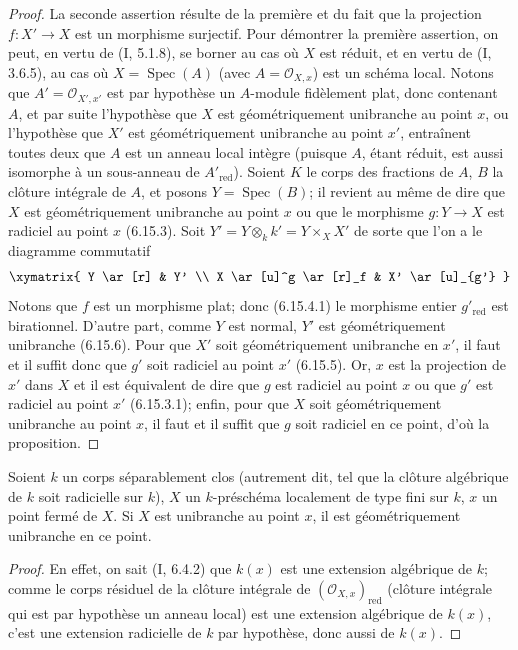 \begin{proof}
La seconde assertion résulte de la première et du fait que la projection
$f:X'\to X$ est un morphisme surjectif. Pour démontrer la première
assertion, on peut, en vertu de (I, 5.1.8), se borner au cas où $X$ est
réduit, et en vertu de (I, 3.6.5), au cas où
$X=\operatorname{Spec}(A)$ (avec $A=\mathcal O_{X,x}$) est un schéma local.
Notons que $A'=\mathcal O_{X',x'}$ est par hypothèse un $A$-module
fidèlement plat, donc contenant $A$, et par suite l'hypothèse que $X$ est
géométriquement unibranche au point $x$, ou l'hypothèse que $X'$ est
géométriquement unibranche au point $x'$, entraînent toutes deux que $A$
est un anneau local intègre (puisque $A$, étant réduit, est aussi isomorphe
à un sous-anneau de $A'_{\mathrm{red}}$). Soient $K$ le corps des fractions
de $A$, $B$ la clôture intégrale de $A$, et posons
$Y=\operatorname{Spec}(B)$; il revient au même de dire que $X$ est
géométriquement unibranche au point $x$ ou que le morphisme $g:Y\to X$
est radiciel au point $x$ (6.15.3). Soit
$Y'=Y\otimes_k k'=Y\times_X X'$ de sorte que l'on a le diagramme
commutatif
\[
\xymatrix{
Y \ar[r] & Y' \\
X \ar[u]^g \ar[r]_f & X' \ar[u]_{g'}
}
\]
Notons que $f$ est un morphisme plat; donc (6.15.4.1) le morphisme entier
$g'_{\mathrm{red}}$ est birationnel. D'autre part, comme $Y$ est normal,
$Y'$ est géométriquement unibranche (6.15.6). Pour que $X'$ soit
géométriquement unibranche en $x'$, il faut et il suffit donc que $g'$
soit radiciel au point $x'$ (6.15.5). Or, $x$ est la projection de $x'$ dans
$X$ et il est équivalent de dire que $g$ est radiciel au point $x$ ou que
$g'$ est radiciel au point $x'$ (6.15.3.1); enfin, pour que $X$ soit
géométriquement unibranche au point $x$, il faut et il suffit que $g$ soit
radiciel en ce point, d'où la proposition.
\end{proof}

\begin{lemma}[6.15.8]
\label{IV.2.s6.15.8-fr}
Soient $k$ un corps séparablement clos (autrement dit, tel que la clôture
algébrique de $k$ soit radicielle sur $k$), $X$ un $k$-préschéma localement
de type fini sur $k$, $x$ un point fermé de $X$. Si $X$ est unibranche au
point $x$, il est géométriquement unibranche en ce point.
\end{lemma}

\begin{proof}
En effet, on sait (I, 6.4.2) que $k(x)$ est une extension algébrique de
$k$; comme le corps résiduel de la clôture intégrale de
$(\mathcal O_{X,x})_{\mathrm{red}}$ (clôture intégrale qui est par
hypothèse un anneau local) est une extension algébrique de $k(x)$, c'est
une extension radicielle de $k$ par hypothèse, donc aussi de $k(x)$.
\end{proof}

